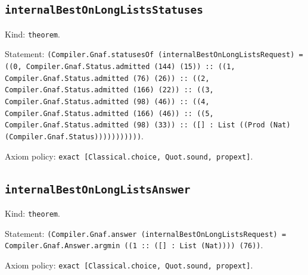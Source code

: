\documentclass[11pt]{article}
\begin{document}
\subsection*{\texttt{internalBestOnLongListsStatuses}}
\noindent Kind: \texttt{theorem}.\par
\noindent Statement: \texttt{(Compiler.Gnaf.statusesOf (internalBestOnLongListsRequest) = ((0, Compiler.Gnaf.Status.admitted (144) (15)) :: ((1, Compiler.Gnaf.Status.admitted (76) (26)) :: ((2, Compiler.Gnaf.Status.admitted (166) (22)) :: ((3, Compiler.Gnaf.Status.admitted (98) (46)) :: ((4, Compiler.Gnaf.Status.admitted (166) (46)) :: ((5, Compiler.Gnaf.Status.admitted (98) (33)) :: ([] : List ((Prod (Nat) (Compiler.Gnaf.Status)))))))))))}.\par
\noindent Axiom policy: \texttt{exact [Classical.choice, Quot.sound, propext]}.\par
\subsection*{\texttt{internalBestOnLongListsAnswer}}
\noindent Kind: \texttt{theorem}.\par
\noindent Statement: \texttt{(Compiler.Gnaf.answer (internalBestOnLongListsRequest) = Compiler.Gnaf.Answer.argmin ((1 :: ([] : List (Nat)))) (76))}.\par
\noindent Axiom policy: \texttt{exact [Classical.choice, Quot.sound, propext]}.\par
\end{document}
